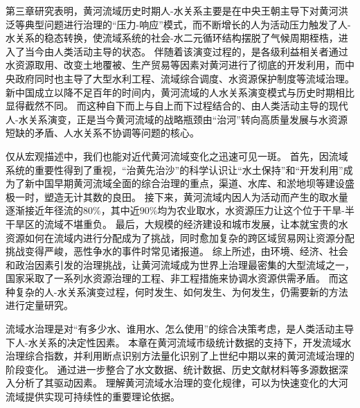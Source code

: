 第三章研究表明，黄河流域历史时期人-水关系主要是在中央王朝主导下对黄河洪泛等典型问题进行治理的“压力-响应”模式，而不断增长的人为活动压力触发了人-水关系的稳态转换，使流域系统的社会-水二元循环结构摆脱了气候周期桎梏，进入了当今由人类活动主导的状态。
伴随着该演变过程的，是各级利益相关者通过水资源取用、改变土地覆被、生产贸易等因素对黄河进行了彻底的开发利用，而中央政府同时也主导了大型水利工程、流域综合调度、水资源保护制度等流域治理。
新中国成立以降不足百年的时间内，黄河流域的人水关系演变模式与历史时期相比显得截然不同。
而这种自下而上与自上而下过程结合的、由人类活动主导的现代人-水关系演变，正是当今黄河流域的战略瓶颈由“治河”转向高质量发展与水资源短缺的矛盾、人水关系不协调等问题的核心。

仅从宏观描述中，我们也能对近代黄河流域变化之迅速可见一斑。
首先，因流域系统的重要性得到了重视，“治黄先治沙”的科学认识让“水土保持”和“开发利用”成为了新中国早期黄河流域全面的综合治理的重点，渠道、水库、和淤地坝等建设盛极一时，塑造无计其数的良田。
接下来，黄河流域内因人为活动而产生的取水量逐渐接近年径流的$80\%$，其中近$90\%$均为农业取水，水资源压力让这个位于干旱-半干旱区的流域不堪重负。
最后，大规模的经济建设和城市发展，让本就宝贵的水资源如何在流域内进行分配成为了挑战，同时愈加复杂的跨区域贸易网让资源分配挑战变得严峻，恶性争水的事件时常见诸报道。
综上所述，由环境、经济、社会和政治因素引发的治理挑战，让黄河流域成为世界上治理最密集的大型流域之一，国家采取了一系列水资源治理的工程、非工程措施来协调水资源供需矛盾。
而这种复杂的人-水关系演变过程，何时发生、如何发生、为何发生，仍需要新的方法进行定量研究。

流域水治理是对“有多少水、谁用水、怎么使用”的综合决策考虑，是人类活动主导下人-水关系的决定性因素。
本章在黄河流域市级统计数据的支持下，开发流域水治理综合指数，并利用断点识别方法量化识别了上世纪中期以来的黄河流域治理的阶段变化。
通过进一步整合了水文数据、统计数据、历史文献材料等多源数据深入分析了其驱动因素。
理解黄河流域水治理的变化规律，可以为快速变化的大河流域提供实现可持续性的重要理论依据。
